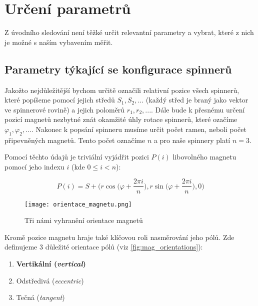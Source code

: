 \section{Určení parametrů}

Z úvodního sledování není těžké určit relevantní parametry a vybrat, které z nich je možné s naším vybavením měřit.

\subsection{Parametry týkající se konfigurace spinnerů}
\label{sub:param_konf}
Jakožto nejdůležitější bychom určitě označili relativní pozice všech spinnerů, které popíšeme pomocí jejich středů $S_1, S_2,...$ (každý střed je braný jako vektor ve spinnerové rovině) a jejich poloměrů $r_1, r_2, ...$.
Dále bude k přesnému určení pozicí magnetů nezbytné znát okamžité úhly rotace spinnerů, které ozačíme $\varphi_1, \varphi_2,...$.
Nakonec k popsání spinneru musíme určit počet ramen, neboli počet připevněných magnetů. Tento počet označíme $n$ a pro naše spinnery platí $n=3$.

Pomocí těchto údajů je triviální vyjádřit pozici $P(i)$ libovolného magnetu pomocí jeho indexu $i$ (kde $0 \leq i < n$):

\begin{equation}
    \label{eq:magnet_pos}
    P(i) = S + \biggr(r\cos{\bigg(\varphi + \frac{2\pi i}{n}\bigg)},
    r\sin{\bigg(\varphi+\frac{2\pi i}{n}}\bigg), 0 \bigg)
\end{equation}

\begin{wrapfigure}{r}{0.4\textwidth}
    \vspace*{-0.5cm}
    \texttt{[image: orientace\_magnetu.png]}
    \centering
    \caption{Tři námi vyhranění orientace magnetů}
    \label{fig:mag_orientations}
\end{wrapfigure}

Kromě pozice magnetu hraje také klíčovou roli nasměrování jeho pólů. Zde definujeme 3 důležité orientace pólů (viz \autoref{fig:mag_orientations}):

\begin{enumerate}[topsep=0pt, partopsep=0pt]
    \setlength{\itemsep}{0pt}%
    \setlength{\parskip}{0pt}%
    \item \textbf{Vertikální (\textit{vertical})}
    \item Odstředivá (\textit{eccentric})
    \item Tečná (\textit{tangent})
\end{enumerate}

